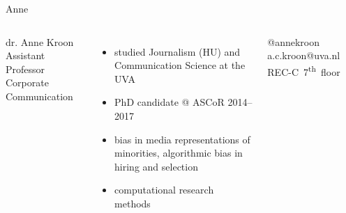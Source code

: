 \begin{frame}{Anne}
	
	\begin{columns}
		dr. Anne Kroon \\
		Assistant Professor Corporate Communication \\
		\begin{itemize}
			\item studied Journalism (HU) and Communication Science at the UVA 
			\item PhD candidate @ ASCoR 2014--2017
			\item bias in media representations of minorities, algorithmic bias in hiring and selection 
			\item computational research methods
		\end{itemize}
		@annekroon ~~ a.c.kroon@uva.nl ~~ REC-C~7\textsuperscript{th}~floor 
	\end{columns}
\end{frame}


